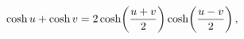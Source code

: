 \[\mathop{\cosh\/}\nolimits u+\mathop{\cosh\/}\nolimits v=2\mathop{\cosh\/}%
\nolimits\!\left(\frac{u+v}{2}\right)\mathop{\cosh\/}\nolimits\!\left(\frac{u-%
v}{2}\right),\]